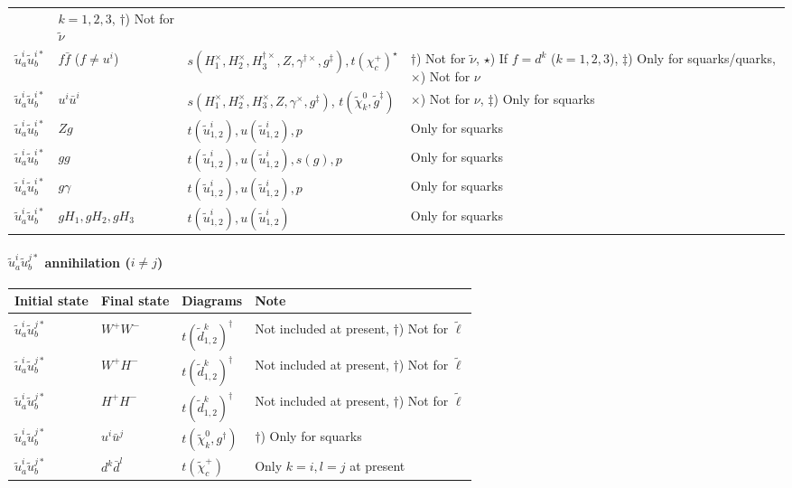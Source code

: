 \documentclass[a4paper,10pt,oneside]{book}
\newcommand{\tabspace}{\\[-2.5ex]}
\begin{document}
{\begin{center}
\begin{tabular}{llll}
& \parbox[t]{4cm}{$k=1,2,3$, $\dagger$) Not for $\tilde{\nu}$} \\
$\tilde{u}^i_a\tilde{u}^{i*}_b$ & $f \bar{f}$ ($f \ne u^i$) &
$s(H_{1}^\times,H_{2}^\times,H_3^{\dagger\times},Z,\gamma^{\dagger\times},g^\ddagger), t({\chi^+_c})^\star$
& \parbox[t]{4cm}{$\dagger$) Not for $\tilde{\nu}$, $\star$) If $f=d^k$ ($k=1,2,3$), $\ddagger$) Only for squarks/quarks, $\times$) Not for $\nu$} \\
$\tilde{u}^i_a\tilde{u}^{i*}_b$ & $u^i \bar{u}^i$ &
$s(H_{1}^\times,H_{2}^\times,H_3^{\times},Z,\gamma^{\times}, g^\ddagger)$, $t(\tilde{\chi}_{k}^0,\tilde{g}^\ddagger)$
& \parbox[t]{4cm}{$\times$) Not for $\nu$,
$\ddagger$) Only for squarks}  \\ 
$\tilde{u}^i_a\tilde{u}^{i*}_b$ & $Z g$ & $t(\tilde{u}^i_{1,2}), u(\tilde{u}^i_{1,2}), p$
& Only for squarks\\
$\tilde{u}^i_a\tilde{u}^{i*}_b$ & $g g$ & $t(\tilde{u}^i_{1,2}), u(\tilde{u}^i_{1,2}), s(g), p$
& Only for squarks\\
$\tilde{u}^i_a\tilde{u}^{i*}_b$ & $g \gamma$ & $t(\tilde{u}^i_{1,2}), u(\tilde{u}^i_{1,2}), p$
& Only for squarks\\
$\tilde{u}^i_a\tilde{u}^{i*}_b$ & $g H_1, g H_2, g H_3$ & 
$t(\tilde{u}^i_{1,2}), u(\tilde{u}^i_{1,2})$
& Only for squarks\\ \hline
\end{tabular}
\end{center}
}

\paragraph{$\tilde{u}^i_a\tilde{u}^{j*}_b$ annihilation ($i \ne j$)}

\begin{center}
\begin{tabular}{llll} \hline
{\bfseries Initial state} & {\bfseries Final state} &
{\bfseries Diagrams} & {\bfseries Note} \\ \hline \tabspace
$\tilde{u}^i_a\tilde{u}^{j*}_b$ & $W^+W^-$ &
$t(\tilde{d}^k_{1,2})^\dagger$
& Not included at present, $\dagger$) Not for $\tilde{\ell}$ \\
$\tilde{u}^i_a\tilde{u}^{j*}_b$ & $W^+ H^-$ &
$t(\tilde{d}^k_{1,2})^\dagger$
& Not included at present, $\dagger$) Not for $\tilde{\ell}$ \\
$\tilde{u}^i_a\tilde{u}^{j*}_b$ & $H^+ H^-$ &
$t(\tilde{d}^k_{1,2})^\dagger$
& Not included at present, $\dagger$) Not for $\tilde{\ell}$ \\
$\tilde{u}^i_a \tilde{u}^{j*}_b$ & $u^i \bar{u}^j$ &
$t(\tilde{\chi}_{k}^0,g^\dagger)$
& $\dagger$) Only for squarks \\
$\tilde{u}^i_a \tilde{u}^{j*}_b$ & $d^k \bar{d}^l$ &
$t(\tilde{\chi}_{c}^+)$
& Only $k=i,l=j$ at present \\ \hline
\end{tabular}
\end{center}
\end{document}
